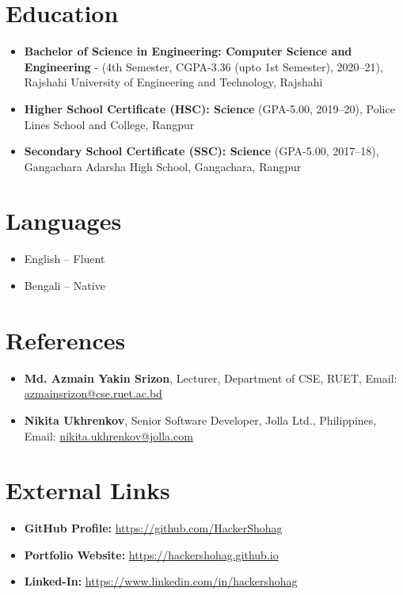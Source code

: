 \documentclass{article}
\begin{document}
\begin{adjustwidth}{0cm}{0cm}
\begin{multicols}{2}
        \section*{Education}
        \begin{itemize}
            \item \textbf{Bachelor of Science in Engineering: Computer Science and Engineering} - (4th Semester, CGPA-3.36 (upto 1st Semester), 2020–21), Rajshahi University of Engineering and Technology, Rajshahi
            \item \textbf{Higher School Certificate (HSC): Science} (GPA-5.00, 2019–20), Police Lines School and College, Rangpur
            \item \textbf{Secondary School Certificate (SSC): Science} (GPA-5.00, 2017–18), Gangachara Adarsha High School, Gangachara, Rangpur
        \end{itemize}

        \section*{Languages}
        \begin{itemize}
            \item English – Fluent
            \item Bengali – Native
        \end{itemize}

        \section*{References}
        \begin{itemize}
            \item \textbf{Md. Azmain Yakin Srizon}, Lecturer, Department of CSE, RUET, Email: \href{mailto:azmainsrizon@cse.ruet.ac.bd}{azmainsrizon@cse.ruet.ac.bd}
            \item \textbf{Nikita Ukhrenkov}, Senior Software Developer, Jolla Ltd., Philippines, Email: \href{mailto:nikita.ukhrenkov@jolla.com}{nikita.ukhrenkov@jolla.com}
        \end{itemize}

        \section*{External Links}
        \begin{itemize}
            \item \textbf{GitHub Profile:} \href{https://github.com/HackerShohag}{https://github.com/HackerShohag}
            \item \textbf{Portfolio Website:} \href{https://hackershohag.github.io}{https://hackershohag.github.io}
            \item \textbf{Linked-In:} \href{https://www.linkedin.com/in/hackershohag}{https://www.linkedin.com/in/hackershohag}
        \end{itemize}
    \end{multicols}
\end{adjustwidth}
\end{document}

